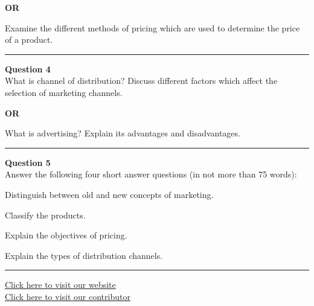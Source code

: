 \documentclass[11pt,a4paper]{article}
\begin{document}
\begin{center}   \textbf{OR}\end{center}

Examine the different methods of pricing which are used to determine the price of a product.

\medskip\rule{\linewidth}{0.2pt}\medskip




\noindent   \textbf{Question 4} \\
What is channel of distribution? Discuss different factors which affect the selection of marketing channels.


\begin{center}   \textbf{OR}\end{center}

What is advertising? Explain its advantages and disadvantages.

\medskip\rule{\linewidth}{0.2pt}\medskip




\noindent   \textbf{Question 5} \\
Answer the following four short answer questions (in not more than 75 words):

\begin{parts}
  \item Distinguish between old and new concepts of marketing.
  \item Classify the products.
  \item Explain the objectives of pricing.
  \item Explain the types of distribution channels.
\end{parts}

\vfill\rule{\linewidth}{0.4pt}

\begin{center}\small
\href{https://bhu-exam.vercel.app/}{Click here to visit our website}\\[4pt]
\href{https://me-aryan.vercel.app/}{Click here to visit our contributor}
\end{center}
\end{document}
